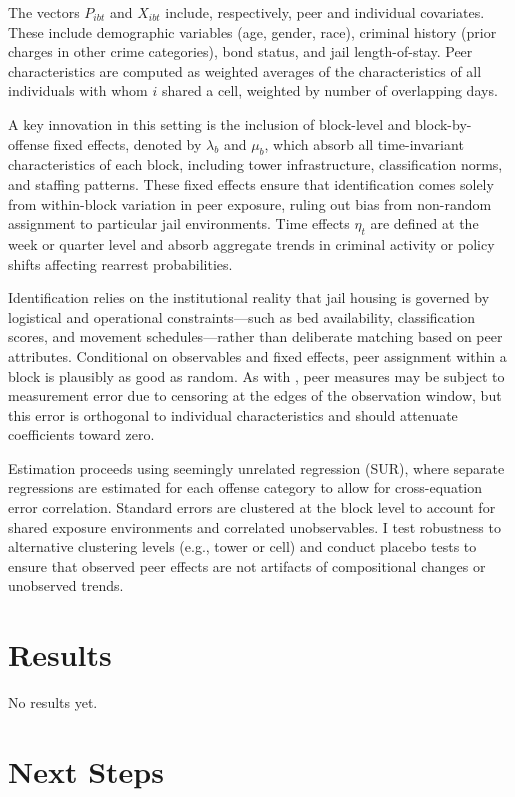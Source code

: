 \documentclass[12pt, a4paper]{article}
\begin{document}
The vectors $P_{ibt}$ and $X_{ibt}$ include, respectively, peer and individual covariates. These include demographic variables (age, gender, race), criminal history (prior charges in other crime categories), bond status, and jail length-of-stay. Peer characteristics are computed as weighted averages of the characteristics of all individuals with whom $i$ shared a cell, weighted by number of overlapping days.

A key innovation in this setting is the inclusion of block-level and block-by-offense fixed effects, denoted by $\lambda_{b}$ and $\mu_{b}$, which absorb all time-invariant characteristics of each block, including tower infrastructure, classification norms, and staffing patterns. These fixed effects ensure that identification comes solely from within-block variation in peer exposure, ruling out bias from non-random assignment to particular jail environments. Time effects $\eta_t$ are defined at the week or quarter level and absorb aggregate trends in criminal activity or policy shifts affecting rearrest probabilities.

Identification relies on the institutional reality that jail housing is governed by logistical and operational constraints—such as bed availability, classification scores, and movement schedules—rather than deliberate matching based on peer attributes. Conditional on observables and fixed effects, peer assignment within a block is plausibly as good as random. As with \citet{bayer2009building}, peer measures may be subject to measurement error due to censoring at the edges of the observation window, but this error is orthogonal to individual characteristics and should attenuate coefficients toward zero.

Estimation proceeds using seemingly unrelated regression (SUR), where separate regressions are estimated for each offense category to allow for cross-equation error correlation. Standard errors are clustered at the block level to account for shared exposure environments and correlated unobservables. I test robustness to alternative clustering levels (e.g., tower or cell) and conduct placebo tests to ensure that observed peer effects are not artifacts of compositional changes or unobserved trends.

\section{Results}

No results yet.

\section{Next Steps}
\end{document}
